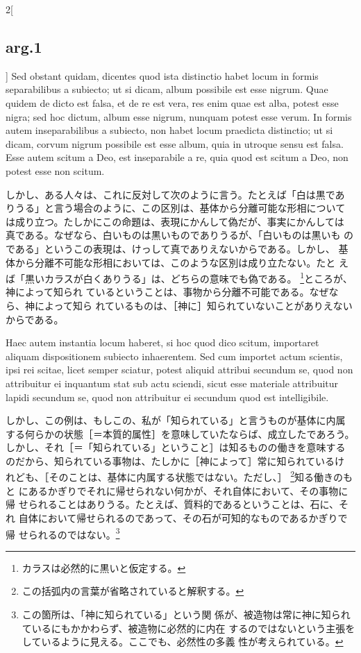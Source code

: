 \documentclass[paper=a4paper,fontsize=10pt,jafontsize=9pt,titlepage]{jlreq}
\begin{document}
\begin{paracol}{2}[\subsection{arg.1}]
Sed obstant quidam, dicentes quod ista distinctio habet locum in
formis separabilibus a subiecto; ut si dicam, album possibile est esse
nigrum. Quae quidem de dicto est falsa, et de re est vera, res enim
quae est alba, potest esse nigra; sed hoc dictum, album esse nigrum,
nunquam potest esse verum. In formis autem inseparabilibus a subiecto,
non habet locum praedicta distinctio; ut si dicam, corvum nigrum
possibile est esse album, quia in utroque sensu est falsa. Esse autem
scitum a Deo, est inseparabile a re, quia quod est scitum a Deo, non
potest esse non scitum.

\switchcolumn

しかし、ある人々は、これに反対して次のように言う。たとえば「白は黒であ
りうる」と言う場合のように、この区別は、基体から分離可能な形相について
は成り立つ。たしかにこの命題は、表現にかんして偽だが、事実にかんしては
真である。なぜなら、白いものは黒いものでありうるが、「白いものは黒いも
のである」というこの表現は、けっして真でありえないからである。しかし、
基体から分離不可能な形相においては、このような区別は成り立たない。たと
えば「黒いカラスが白くありうる」は、どちらの意味でも偽である。
\footnote{カラスは必然的に黒いと仮定する。}ところが、神によって知られ
ているということは、事物から分離不可能である。なぜなら、神によって知ら
れているものは、［神に］知られていないことがありえないからである。

\switchcolumn*

Haec autem instantia locum haberet, si hoc quod dico scitum,
importaret aliquam dispositionem subiecto inhaerentem. Sed cum
importet actum scientis, ipsi rei scitae, licet semper sciatur, potest
aliquid attribui secundum se, quod non attribuitur ei inquantum stat
sub actu sciendi, sicut esse materiale attribuitur lapidi secundum se,
quod non attribuitur ei secundum quod est intelligibile.

\switchcolumn

しかし、この例は、もしこの、私が「知られている」と言うものが基体に内属
する何らかの状態［＝本質的属性］を意味していたならば、成立したであろう。
しかし、それ［＝「知られている」ということ］は知るものの働きを意味する
のだから、知られている事物は、たしかに［神によって］常に知られているけ
れども、［そのことは、基体に内属する状態ではない。ただし、］
\footnote{この括弧内の言葉が省略されていると解釈する。}知る働きのもと
にあるかぎりでそれに帰せられない何かが、それ自体において、その事物に帰
せられることはありうる。たとえば、質料的であるということは、石に、それ
自体において帰せられるのであって、その石が可知的なものであるかぎりで帰
せられるのではない。\footnote{この箇所は、「神に知られている」という関
係が、被造物は常に神に知られているにもかかわらず、被造物に必然的に内在
するのではないという主張をしているように見える。ここでも、必然性の多義
性が考えられている。}

\end{paracol}
\end{document}
